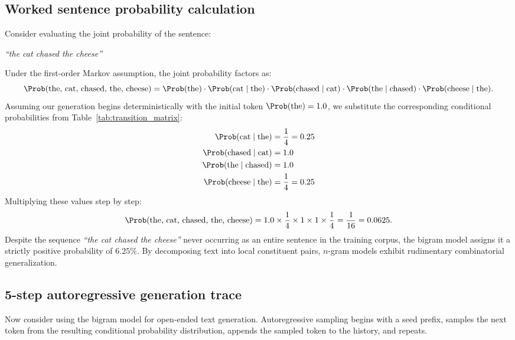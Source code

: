 \documentclass[../../main.tex]{subfiles}
\begin{document}
\subsection{Worked sentence probability calculation}
Consider evaluating the joint probability of the sentence:
\begin{center}
\textit{``the cat chased the cheese''}
\end{center}
Under the first-order Markov assumption, the joint probability factors as:
\begin{equation}
\label{eq:joint_calc_formula}
\Prob(\text{the, cat, chased, the, cheese}) = \Prob(\text{the}) \cdot \Prob(\text{cat} \mid \text{the}) \cdot \Prob(\text{chased} \mid \text{cat}) \cdot \Prob(\text{the} \mid \text{chased}) \cdot \Prob(\text{cheese} \mid \text{the}).
\end{equation}
Assuming our generation begins deterministically with the initial token $\Prob(\text{the}) = 1.0$, we substitute the corresponding conditional probabilities from Table~\ref{tab:transition_matrix}:
\begin{align}
\Prob(\text{cat} \mid \text{the}) &= \frac{1}{4} = 0.25 \notag \\
\Prob(\text{chased} \mid \text{cat}) &= 1.0 \notag \\
\Prob(\text{the} \mid \text{chased}) &= 1.0 \notag \\
\Prob(\text{cheese} \mid \text{the}) &= \frac{1}{4} = 0.25 \notag
\end{align}
Multiplying these values step by step:
\begin{equation}
\label{eq:joint_exact_result}
\Prob(\text{the, cat, chased, the, cheese}) = 1.0 \times \frac{1}{4} \times 1 \times 1 \times \frac{1}{4} = \frac{1}{16} = 0.0625.
\end{equation}
Despite the sequence \textit{``the cat chased the cheese''} never occurring as an entire sentence in the training corpus, the bigram model assigns it a strictly positive probability of $6.25\%$. By decomposing text into local constituent pairs, $n$-gram models exhibit rudimentary combinatorial generalization.

\subsection{5-step autoregressive generation trace}
Now consider using the bigram model for open-ended text generation. Autoregressive sampling begins with a seed prefix, samples the next token from the resulting conditional probability distribution, appends the sampled token to the history, and repeats.
\end{document}
